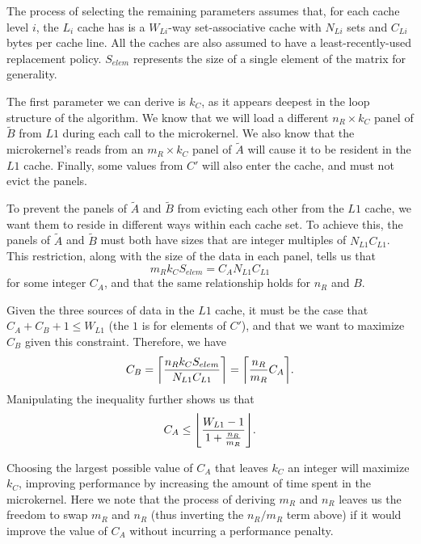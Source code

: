 \documentclass[12pt]{article}
\DeclarePairedDelimiter\ceil{\lceil}{\rceil}
\DeclarePairedDelimiter\floor{\lfloor}{\rfloor}
\begin{document}
The process of selecting the remaining parameters assumes that, for each cache level $i$, the $L_i$ cache has is a $W_{Li}$-way set-associative cache with $N_{Li}$ sets and $C_{Li}$ bytes per cache line.
All the caches are also assumed to have a least-recently-used replacement policy.
$S_{elem}$ represents the size of a single element of the matrix for generality.

The first parameter we can derive is $k_C$, as it appears deepest in the loop structure of the algorithm.
We know that we will load a different $n_R \times k_C$ panel of $\widetilde{B}$ from $L1$ during each call to the microkernel.
We also know that the microkernel's reads from an $m_R \times k_C$ panel of $\widetilde{A}$ will cause it to be resident in the $L1$ cache.
Finally, some values from $C'$ will also enter the cache, and must not evict the panels.

To prevent the panels of $\widetilde{A}$ and $\widetilde{B}$ from evicting each other from the $L1$ cache, we want them to reside in different ways within each cache set.
To achieve this, the panels of $\widetilde{A}$ and $\widetilde{B}$ must both have sizes that are integer multiples of $N_{L1}C_{L1}$.
This restriction, along with the size of the data in each panel, tells us that
\begin{equation*}
  m_Rk_CS_{elem} = C_AN_{L1}C_{L1}
\end{equation*}
for some integer $C_A$, and that the same relationship holds for $n_R$ and $B$.

Given the three sources of data in the $L1$ cache, it must be the case that $C_A + C_B + 1 \leq W_{L1}$ (the $1$ is for elements of $C'$), and that we want to maximize $C_B$ given this constraint.
Therefore, we have
\begin{equation*}
  C_B = \ceil*{\frac{n_Rk_CS_{elem}}{N_{L1}C_{L1}}} = \ceil*{\frac{n_R}{m_R}C_A}.
\end{equation*}
Manipulating the inequality further shows us that
\begin{equation*}
  C_A \leq \floor*{\frac{W_{L1} - 1}{1 + \frac{n_R}{m_R}}}.
\end{equation*}

Choosing the largest possible value of $C_A$ that leaves $k_C$ an integer will maximize $k_C$, improving performance by increasing the amount of time spent in the microkernel.
Here we note that the process of deriving $m_R$ and $n_R$ leaves us the freedom to swap $m_R$ and $n_R$ (thus inverting the $n_R/m_R$ term above) if it would improve the value of $C_A$ without incurring a performance penalty.
\end{document}
